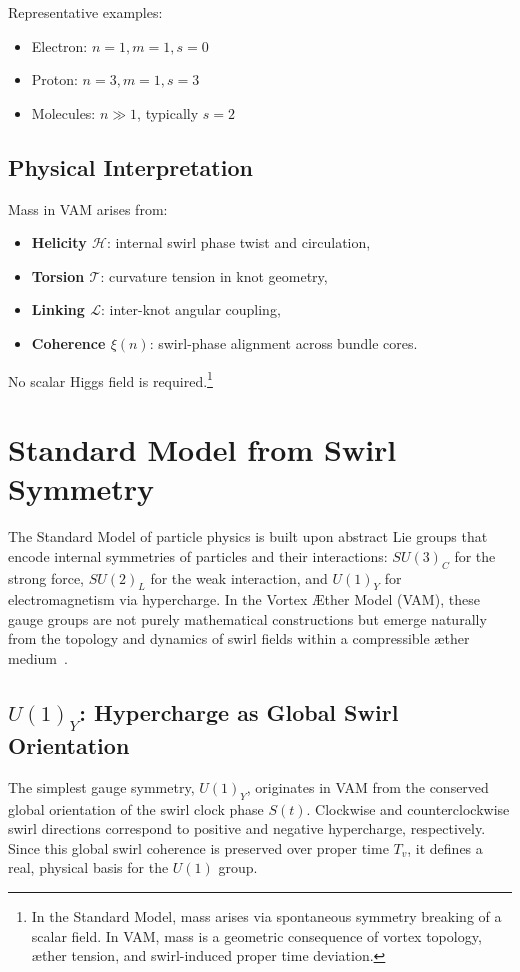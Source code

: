 \documentclass[preprint]{revtex4-2}
\begin{document}
    \noindent Representative examples:
    \begin{itemize}
        \item Electron: \( n=1, m=1, s=0 \)
        \item Proton: \( n=3, m=1, s=3 \)
        \item Molecules: \( n \gg 1 \), typically \( s = 2 \)
    \end{itemize}

    \subsection*{Physical Interpretation}

    Mass in VAM arises from:
    \begin{itemize}
        \item \textbf{Helicity \( \mathcal{H} \)}: internal swirl phase twist and circulation,
        \item \textbf{Torsion \( \mathcal{T} \)}: curvature tension in knot geometry,
        \item \textbf{Linking \( \mathcal{L} \)}: inter-knot angular coupling,
        \item \textbf{Coherence \( \xi(n) \)}: swirl-phase alignment across bundle cores.
    \end{itemize}

    \noindent No scalar Higgs field is required.\footnote{In the Standard Model, mass arises via spontaneous symmetry breaking of a scalar field. In VAM, mass is a geometric consequence of vortex topology, æther tension, and swirl-induced proper time deviation.}

\section{Standard Model from Swirl Symmetry}
    The Standard Model of particle physics is built upon abstract Lie groups that encode internal symmetries of particles and their interactions: \( SU(3)_C \) for the strong force, \( SU(2)_L \) for the weak interaction, and \( U(1)_Y \) for electromagnetism via hypercharge. In the Vortex \AE{}ther Model (VAM), these gauge groups are not purely mathematical constructions but emerge naturally from the topology and dynamics of swirl fields within a compressible æther medium~\cite{arnold1998topological, volovik2003universe, kleckner2013creation}.

    \subsection{\textbf{\boldmath\texorpdfstring{$U(1)_Y$}{U(1)Y}}: Hypercharge as Global Swirl Orientation}
    The simplest gauge symmetry, \( U(1)_Y \), originates in VAM from the conserved global orientation of the swirl clock phase \( S(t) \). Clockwise and counterclockwise swirl directions correspond to positive and negative hypercharge, respectively. Since this global swirl coherence is preserved over proper time \( T_v \), it defines a real, physical basis for the \( U(1) \) group.
\end{document}
